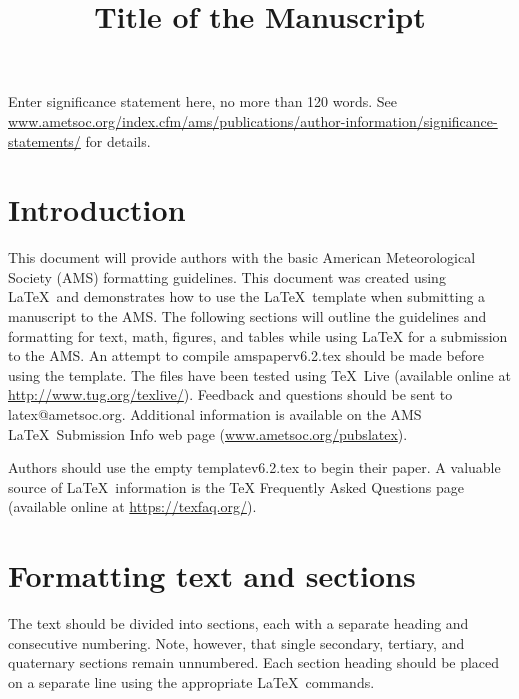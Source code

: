 \documentclass{ametsocV6.2}
\title{Title of the Manuscript}
\affiliation{\aff{a}{First Affiliation}\\
\aff{b}{Second Affiliation}\\
\aff{c}{Third Affiliation}\\
\aff{d}{Fourth Affiliation}
}
\begin{document}
\maketitle

%
%
%
\sigstatement
	 Enter significance statement here, no more than 120 words. See \url{www.ametsoc.org/index.cfm/ams/publications/author-information/significance-statements/} for details.
%
%


%
\section{Introduction}

This document will provide authors with the basic American Meteorological
Society (AMS) formatting guidelines. This document was created using \LaTeX\
and demonstrates how to use the \LaTeX\ template when submitting a manuscript
to the AMS.  The following sections will outline the guidelines and
formatting for text, math, figures, and tables while using \LaTeX\/ for a
submission to the AMS. An attempt to compile amspaperv6.2.tex should be made
before using the template. The files have been tested using \TeX\ Live (available online at
\url{http://www.tug.org/texlive/}). Feedback and questions should be sent to
latex@ametsoc.org. Additional information is available on the AMS \LaTeX\ Submission Info
web page (\url{www.ametsoc.org/pubslatex}).

Authors should use the empty templatev6.2.tex to begin their
paper. A valuable source of \LaTeX\ information is the {TeX
Frequently Asked Questions} page (available online at \url{https://texfaq.org/}).

\section{Formatting text and sections}
The text should be divided into sections, each with a separate heading and
consecutive numbering. Note, however, that single secondary, tertiary, and
quaternary sections remain unnumbered. Each section heading should be placed
on a separate line using the appropriate \LaTeX\ commands.
\end{document}
